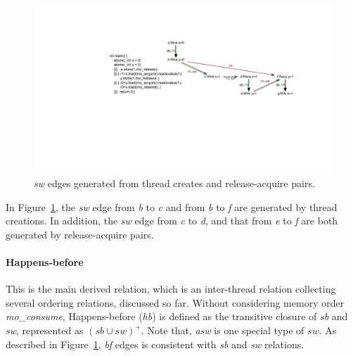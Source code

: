 \documentclass[preprint, numbers, 10pt]{sigplanconf}
\begin{document}
\begin{figure}%
\centering\includegraphics[scale=0.4]{sw_Relation.pdf} %
\caption{\textit{sw} edges generated from thread creates and 
release-acquire pairs. }
\label{fig:sw_relation}
\end{figure}

In Figure~\ref{fig:sw_relation}, the \textit{sw} edge from \textit{b} to \textit{c}
and from \textit{b} to \textit{f} are generated by thread creations. In addition,
the \textit{sw} edge from \textit{c} to \textit{d}, and that from \textit{e} to
\textit{f} are both generated by release-acquire pairs. 

\paragraph{Happens-before}

This is the main derived relation, which is an inter-thread relation 
collecting several ordering relations, discussed so far. 
Without considering memory order \textit{mo\_consume}, 
Happens-before (\textit{hb}) is defined as the transitive 
closure of \textit{sb} and \textit{sw}, represented as $(sb\cup sw)^+$. 
Note that, \textit{asw} is one special type of $sw$. 
As described in Figure~\ref{fig:sw_relation}, \textit{bf} edges is consistent
with \textit{sb} and \textit{sw} relations.  
\end{document}
